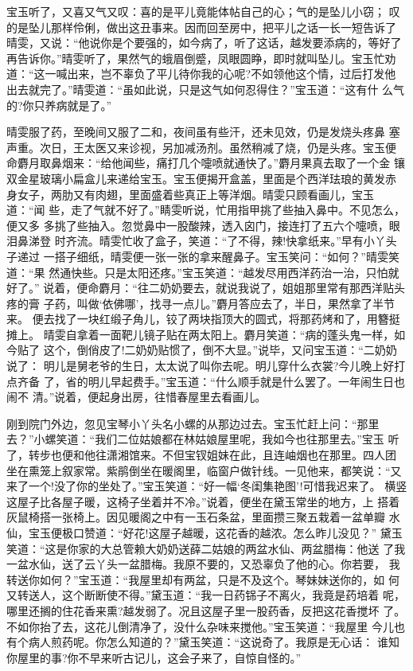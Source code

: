 宝玉听了，又喜又气又叹：喜的是平儿竟能体帖自己的心；气的是坠儿小窃；
叹的是坠儿那样伶俐，做出这丑事来。因而回至房中，把平儿之话一长一短告诉了
晴雯，又说：“他说你是个要强的，如今病了，听了这话，越发要添病的，等好了
再告诉你。”晴雯听了，果然气的蛾眉倒蹙，凤眼圆睁，即时就叫坠儿。宝玉忙劝
道：“这一喊出来，岂不辜负了平儿待你我的心呢?不如领他这个情，过后打发他
出去就完了。”晴雯道：“虽如此说，只是这气如何忍得住？”宝玉道：“这有什
么气的?你只养病就是了。”

晴雯服了药，至晚间又服了二和，夜间虽有些汗，还未见效，仍是发烧头疼鼻
塞声重。次日，王太医又来诊视，另加减汤剂。虽然稍减了烧，仍是头疼。宝玉便
命麝月取鼻烟来：“给他闻些，痛打几个嚏喷就通快了。”麝月果真去取了一个金
镶双金星玻璃小扁盒儿来递给宝玉。宝玉便揭开盒盖，里面是个西洋珐琅的黄发赤
身女子，两肋又有肉翅，里面盛着些真正上等洋烟。晴雯只顾看画儿，宝玉道：“闻
些，走了气就不好了。”睛雯听说，忙用指甲挑了些抽入鼻中。不见怎么，便又多
多挑了些抽入。忽觉鼻中一股酸辣，透入囟门，接连打了五六个嚏喷，眼泪鼻涕登
时齐流。晴雯忙收了盒子，笑道：“了不得，辣!快拿纸来。”早有小丫头子递过
一搭子细纸，晴雯便一张一张的拿来醒鼻子。宝玉笑问：“如何？”晴雯笑道：“果
然通快些。只是太阳还疼。”宝玉笑道：“越发尽用西洋药治一治，只怕就好了。”
说着，便命麝月：“往二奶奶要去，就说我说了，姐姐那里常有那西洋贴头疼的膏
子药，叫做‘依佛哪’，找寻一点儿。”麝月答应去了，半日，果然拿了半节来。
便去找了一块红缎子角儿，铰了两块指顶大的圆式，将那药烤和了，用簪挺摊上。
晴雯自拿着一面靶儿镜子贴在两太阳上。麝月笑道：“病的蓬头鬼一样，如今贴了
这个，倒俏皮了!二奶奶贴惯了，倒不大显。”说毕，又问宝玉道：“二奶奶说了：
明儿是舅老爷的生日，太太说了叫你去呢。明儿穿什么衣裳?今儿晚上好打点齐备
了，省的明儿早起费手。”宝玉道：“什么顺手就是什么罢了。一年闹生日也闹不
清。”说着，便起身出房，往惜春屋里去看画儿。

刚到院门外边，忽见宝琴小丫头名小螺的从那边过去。宝玉忙赶上问：“那里
去？”小螺笑道：“我们二位姑娘都在林姑娘屋里呢，我如今也往那里去。”宝玉
听了，转步也便和他往潇湘馆来。不但宝钗姐妹在此，且连岫烟也在那里。四人团
坐在熏笼上叙家常。紫鹃倒坐在暖阁里，临窗户做针线。一见他来，都笑说：“又
来了一个!没了你的坐处了。”宝玉笑道：“好一幅‘冬闺集艳图’!可惜我迟来了。
横竖这屋子比各屋子暖，这椅子坐着并不冷。”说着，便坐在黛玉常坐的地方，上
搭着灰鼠椅搭一张椅上。因见暖阁之中有一玉石条盆，里面攒三聚五栽着一盆单瓣
水仙，宝玉便极口赞道：“好花!这屋子越暖，这花香的越浓。怎么昨儿没见？”
黛玉笑道：“这是你家的大总管赖大奶奶送薛二姑娘的两盆水仙、两盆腊梅：他送
了我一盆水仙，送了云丫头一盆腊梅。我原不要的，又恐辜负了他的心。你若要，
我转送你如何？”宝玉道：“我屋里却有两盆，只是不及这个。琴妹妹送你的，如
何又转送人，这个断断使不得。”黛玉道：“我一日药铞子不离火，我竟是药培着
呢，哪里还搁的住花香来熏?越发弱了。况且这屋子里一股药香，反把这花香搅坏
了。不如你抬了去，这花儿倒清净了，没什么杂味来搅他。”宝玉笑道：“我屋里
今儿也有个病人煎药呢。你怎么知道的？”黛玉笑道：“这说奇了。我原是无心话：
谁知你屋里的事?你不早来听古记儿，这会子来了，自惊自怪的。”

